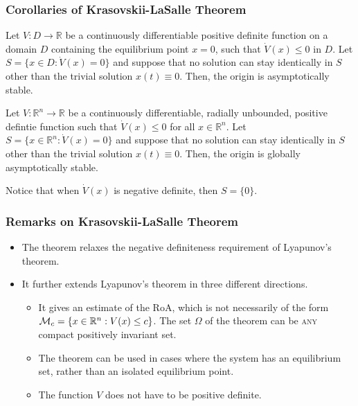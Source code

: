 \begin{frame}
    \frametitle{Corollaries of Krasovskii-LaSalle Theorem}

    \begin{corollary}
        Let $V: D \rightarrow \mathbb{R}$ be a continuously differentiable
        positive definite function on a domain $D$ containing the equilibrium
        point $x=0$, such that $\dot{V}(x) \leq 0$ in $D$. Let $S = \{x \in D:
        \dot{V}(x) = 0\}$ and suppose that no solution can stay identically in
        $S$ other than the trivial solution $x(t) \equiv 0$. Then, the origin is
        asymptotically stable.
    \end{corollary}

    \begin{corollary}
        Let $V: \mathbb{R}^n \rightarrow \mathbb{R}$ be a continuously
        differentiable, radially unbounded, positive defintie function such that
        $\dot{V}(x) \leq 0$ for all $x \in \mathbb{R}^n$. Let $S = \{x \in
        \mathbb{R}^n: \dot{V}(x) = 0\}$ and suppose that no solution can stay
        identically in $S$ other than the trivial solution $x(t) \equiv 0$.
        Then, the origin is globally asymptotically stable.
    \end{corollary}

    Notice that when $\dot{V}(x)$ is negative definite, then $S = \{0\}$.
\end{frame}


\begin{frame}
    \frametitle{Remarks on Krasovskii-LaSalle Theorem}

    \begin{itemize}
        \item The theorem relaxes the negative definiteness requirement of
        Lyapunov's theorem.
        \item It further extends Lyapunov's theorem in three different
        directions.
        \begin{itemize}
            \item It gives an estimate of the RoA, which is not necessarily of
            the form $\mathcal{M}_c = \{ x \in \mathbb{R}^n: V(x) \leq c\}$. The set
            $\Omega$ of the theorem can be \textsc{any} compact positively
            invariant set.
            \item The theorem can be used in cases where the system has an
            equilibrium set, rather than an isolated equilibrium point.
            \item The function $V$ does not have to be positive definite.
        \end{itemize}
    \end{itemize}
\end{frame}


